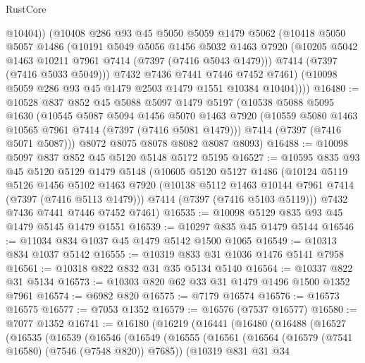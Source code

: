 \begin{lexlean}{RustCore}
\begin{coremodule}
            @10404))
        (@10408
          @286
          @93
          @45
          @5050
          @5059
          @1479
          @5062
          (@10418
            @5050
            @5057
            @1486
            (@10191
              @5049
              @5056
              @1456
              @5032
              @1463
              @7920
              (@10205 @5042 @1463 @10211 @7961 @7414 (@7397 (@7416 @5043 @1479)))
              @7414
              (@7397 (@7416 @5033 @5049)))
            @7432
            @7436
            @7441
            @7446
            @7452
            @7461)
          (@10098 @5059 @286 @93 @45 @1479 @2503 @1479 @1551 @10384 @10404))))
@16480 := @10528
    @837
    @852
    @45
    @5088
    @5097
    @1479
    @5197
    (@10538
      @5088
      @5095
      @1630
      (@10545
        @5087
        @5094
        @1456
        @5070
        @1463
        @7920
        (@10559 @5080 @1463 @10565 @7961 @7414 (@7397 (@7416 @5081 @1479)))
        @7414
        (@7397 (@7416 @5071 @5087)))
      @8072
      @8075
      @8078
      @8082
      @8087
      @8093)
@16488 := @10098 @5097 @837 @852 @45 @5120 @5148 @5172 @5195
@16527 := @10595
    @835
    @93
    @45
    @5120
    @5129
    @1479
    @5148
    (@10605
      @5120
      @5127
      @1486
      (@10124
        @5119
        @5126
        @1456
        @5102
        @1463
        @7920
        (@10138 @5112 @1463 @10144 @7961 @7414 (@7397 (@7416 @5113 @1479)))
        @7414
        (@7397 (@7416 @5103 @5119)))
      @7432
      @7436
      @7441
      @7446
      @7452
      @7461)
@16535 := @10098 @5129 @835 @93 @45 @1479 @5145 @1479 @1551
@16539 := @10297 @835 @45 @1479 @5144
@16546 := @11034 @834 @1037 @45 @1479 @5142 @1500 @1065
@16549 := @10313 @834 @1037 @5142
@16555 := @10319 @833 @31 @1036 @1476 @5141 @7958
@16561 := @10318 @822 @832 @31 @35 @5134 @5140
@16564 := @10337 @822 @31 @5134
@16573 := @10303 @820 @62 @33 @31 @1479 @1496 @1500 @1352 @7961
@16574 := @6982 @820
@16575 := @7179 @16574
@16576 := @16573 @16575
@16577 := @7053 @1352
@16579 := @16576 (@7537 @16577)
@16580 := @7077 @1352
@16741 := @16180
    (@16219
      (@16441
        (@16480
          (@16488
            (@16527
              (@16535
                (@16539
                  (@16546
                    (@16549
                      (@16555
                        (@16561
                          (@16564 (@16579 (@7541 @16580) (@7546 (@7548 @820)) @7685))
                          (@10319
                            @831
                            @31
                            @34

\end{coremodule}
\end{lexlean}
